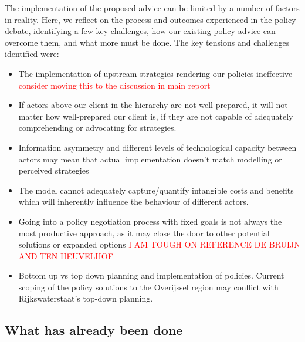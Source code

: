 The implementation of the proposed advice can be limited by a number of factors in reality. Here, we reflect on the process and outcomes experienced in the policy debate, identifying a few key challenges, how our existing policy advice can overcome them, and what more must be done. The key tensions and challenges identified were:
\begin{itemize}
    \item The implementation of upstream strategies rendering our policies ineffective \textcolor{red}{consider moving this to the discussion in main report}
    \item If actors above our client in the hierarchy are not well-prepared, it will not matter how well-prepared our client is, if they are not capable of adequately comprehending or advocating for strategies. %
    \item Information asymmetry and different levels of technological capacity between actors may mean that actual implementation doesn't match modelling or perceived strategies
    \item The model cannot adequately capture/quantify intangible costs and benefits which will inherently influence the behaviour of different actors.
    \item Going into a policy negotiation process with fixed goals is not always the most productive approach, as it may close the door to other potential solutions or expanded options \textcolor{red}{I AM TOUGH ON REFERENCE DE BRUIJN AND TEN HEUVELHOF}
    \item Bottom up vs top down planning and implementation of policies. Current scoping of the policy solutions to the Overijssel region may conflict with Rijkswaterstaat's top-down planning. 
\end{itemize}

\subsection{What has already been done}

